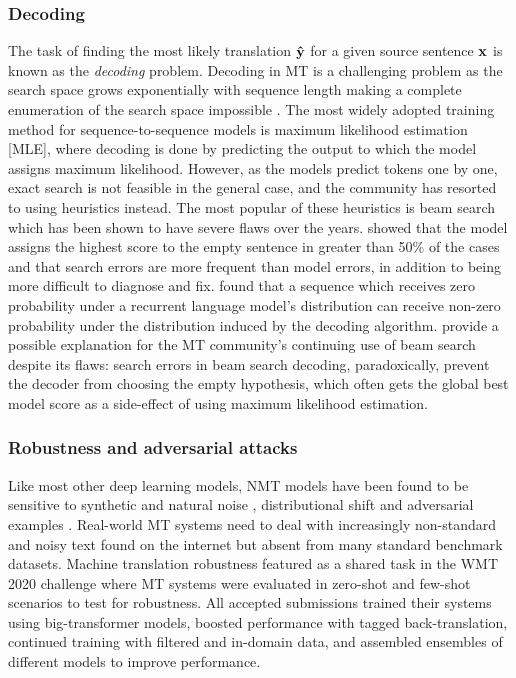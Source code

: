 \documentclass[11pt]{article}
\begin{document}
\subsubsection*{Decoding} \vspace{-2mm}
The task of finding the most likely translation $\bf \hat y$ for a given source sentence $\bf x$ is known as the \textit{decoding} problem. 
Decoding in MT is a challenging problem as the search space grows exponentially with sequence length making a complete enumeration of the search space impossible \citep{sutskever2014sequence}. 
The most widely adopted training method for sequence-to-sequence models is maximum likelihood estimation [MLE], where decoding is done by predicting the output to which the model assigns maximum likelihood.
However, as the models predict tokens one by one, exact search is not feasible in the general case, and the community has resorted to using heuristics instead.
The most popular of these heuristics is beam search which has been shown to have severe flaws over the years.
\cite{stahlberg-byrne-2019-nmt} showed that the model assigns the highest score to the empty sentence in greater than 50\% of the cases and that search errors are more frequent than model errors, in addition to being more difficult to diagnose and fix. 
\cite{welleck-etal-2020-consistency} found that a sequence which receives zero probability under a recurrent language model's distribution can receive non-zero probability under the distribution induced by the decoding algorithm.
\cite{stahlberg-byrne-2019-nmt} provide a possible explanation for the MT community's continuing use of beam search despite its flaws: search errors in beam search decoding, paradoxically, prevent the decoder from choosing the empty hypothesis, which often gets the global best model score as a side-effect of using maximum likelihood estimation.

\subsubsection*{Robustness and adversarial attacks} \vspace{-2mm}
Like most other deep learning models, NMT models have been found to be sensitive to synthetic and natural noise \citep{DBLP:conf/iclr/BelinkovB18}, distributional shift and adversarial examples \citep{heigold-etal-2018-robust}.
Real-world MT systems need to deal with increasingly non-standard and noisy text found on the internet but absent from many standard benchmark datasets. 
Machine translation robustness featured as a shared task in the WMT 2020 challenge \citep{specia2020findings} where MT systems were evaluated in zero-shot and few-shot scenarios to test for robustness. All accepted submissions trained their systems using big-transformer models, boosted performance with tagged back-translation, continued training with filtered and in-domain data, and assembled ensembles of different models to improve performance.
\end{document}

